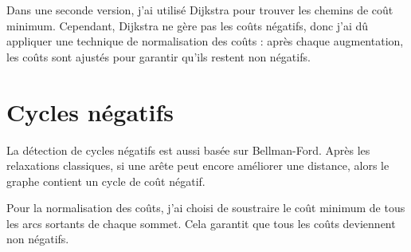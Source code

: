 \documentclass{rapportClass}
\begin{document}
Dans une seconde version, j'ai utilisé Dijkstra pour trouver les chemins de coût minimum. Cependant, Dijkstra ne gère pas les coûts négatifs, donc j'ai dû appliquer une technique de normalisation des coûts : après chaque augmentation, les coûts sont ajustés pour garantir qu'ils restent non négatifs.

\section{Cycles négatifs}
La détection de cycles négatifs est aussi basée sur Bellman-Ford. Après les relaxations classiques, si une arête peut encore améliorer une distance, alors le graphe contient un cycle de coût négatif.

Pour la normalisation des coûts, j'ai choisi de soustraire le coût minimum de tous les arcs sortants de chaque sommet. Cela garantit que tous les coûts deviennent non négatifs.
\end{document}
